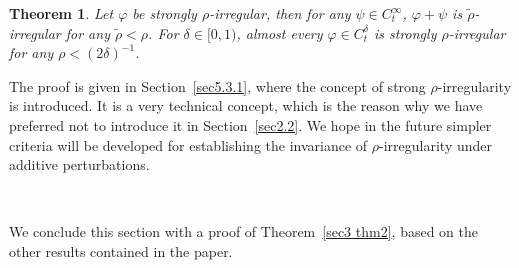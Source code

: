 \documentclass[10pt]{article}
\newtheorem{theorem}{Theorem}
\begin{document}
\begin{theorem}
  \label{sec3 thm5}Let $\varphi$ be strongly $\rho$\mbox{-}irregular, then for
  any $\psi \in C^{\infty}_t$, $\varphi + \psi$ is
  $\tilde{\rho}$\mbox{-}irregular for any $\tilde{\rho} < \rho$. For $\delta
  \in [0, 1)$, almost every $\varphi \in C^{\delta}_t$ is strongly
  $\rho$\mbox{-}irregular for any $\rho < (2 \delta)^{- 1}$.
\end{theorem}

The proof is given in Section~\ref{sec5.3.1}, where the concept of strong
$\rho$\mbox{-}irregularity is introduced. It is a very technical concept,
which is the reason why we have preferred not to introduce it in
Section~\ref{sec2.2}. We hope in the future simpler criteria will be developed
for establishing the invariance of $\rho$\mbox{-}irregularity under additive
perturbations.

\

We conclude this section with a proof of Theorem~\ref{sec3 thm2}, based on
the other results contained in the paper.
\end{document}
